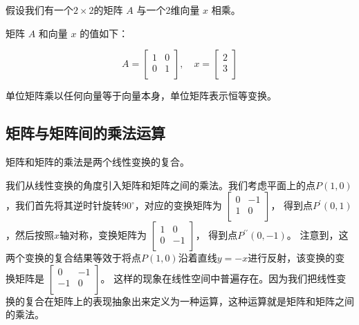 \begin{exercise}
    假设我们有一个$2\times 2$的矩阵 $A$ 与一个2维向量 $x$ 相乘。

矩阵 $A$ 和向量 $x$ 的值如下：

\begin{equation*}
A = \begin{bmatrix}
1 & 0 \\
0 & 1 \\
\end{bmatrix},\quad
x = \begin{bmatrix}
2 \\
3 \\
\end{bmatrix}
\end{equation*}
\end{exercise}

单位矩阵乘以任何向量等于向量本身，单位矩阵表示恒等变换。

\subsection{矩阵与矩阵间的乘法运算}

\begin{note}
    矩阵和矩阵的乘法是两个线性变换的复合。
\end{note}

\vspace{0.3cm}

我们从线性变换的角度引入矩阵和矩阵之间的乘法。我们考虑平面上的点$P(1,0)$，我们首先将其逆时针旋转$90^{\circ}$，对应的变换矩阵为
$
\begin{bmatrix}
0 & -1 \\
1 & 0 \\
\end{bmatrix}
$，
得到点$P^{\prime} (0, 1)$，然后按照$x$轴对称，变换矩阵为
$
\begin{bmatrix}
1 & 0 \\
0 & -1 \\
\end{bmatrix}
$，
得到点$P^{\prime\prime}(0,-1)$。
注意到，这两个变换的复合结果等效于将点$P(1,0)$沿着直线$y=-x$进行反射，该变换的变换矩阵是
$\begin{bmatrix}
0 & -1 \\
-1 & 0 \\
\end{bmatrix}$。
这样的现象在线性空间中普遍存在。因为我们把线性变换的复合在矩阵上的表现抽象出来定义为一种运算，这种运算就是矩阵和矩阵之间的乘法。

